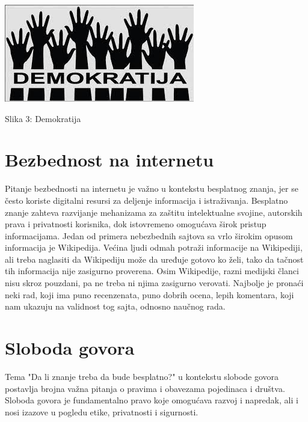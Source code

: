 \documentclass[a4paper]{article}
\begin{document}
{\begin{verbatim}

\end{verbatim}

\begin{center}
\includegraphics[scale=0.85]{demokratija.jpeg}
\end{center}
\caption{Slika 3: Demokratija}
\label{demokratija}


\setlength{\parskip}{1em}

\section{Bezbednost na internetu}
\label{Bezbednost na internetu}


Pitanje bezbednosti na internetu je važno u kontekstu besplatnog znanja, jer se često koriste digitalni resursi za deljenje informacija i istraživanja. Besplatno znanje zahteva razvijanje mehanizama za zaštitu intelektualne svojine, autorskih prava i privatnosti korisnika, dok istovremeno omogućava širok pristup informacijama. Jedan od primera nebezbednih sajtova sa vrlo širokim opusom informacija je Wikipedija. Većina ljudi odmah potraži informacije na Wikipediji, ali treba naglasiti da Wikipediju može da uređuje gotovo ko želi, tako da tačnost tih informacija nije zasigurno proverena. Osim Wikipedije, razni medijski članci nisu skroz pouzdani, pa ne treba ni njima zasigurno verovati. Najbolje je pronaći neki rad, koji ima puno recenzenata, puno dobrih ocena, lepih komentara, koji nam ukazuju na validnost tog sajta, odnosno naučnog rada. 


\setlength{\parskip}{1em}

\section{Sloboda govora}
\label{Sloboda govora}

Tema "Da li znanje treba da bude besplatno?" u kontekstu slobode govora postavlja brojna važna pitanja o pravima i obavezama pojedinaca i društva. Sloboda govora je fundamentalno pravo koje omogućava razvoj i napredak, ali i nosi izazove u pogledu etike, privatnosti i sigurnosti.

}
\end{document}
